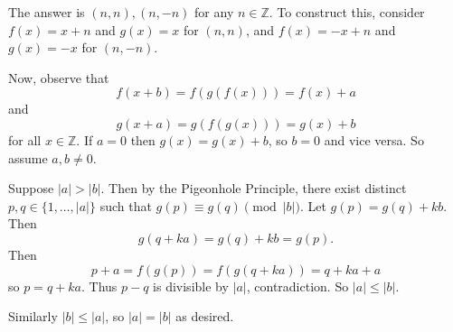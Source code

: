 The answer is $\boxed{(n,n),(n,-n)}$ for any $n\in\mathbb{Z}$. To construct this, consider $f(x)=x+n$ and $g(x)=x$ for $(n,n)$, and $f(x)=-x+n$ and $g(x)=-x$ for $(n,-n)$.

Now, observe that \[f(x+b)=f(g(f(x)))=f(x)+a\] and \[g(x+a)=g(f(g(x)))=g(x)+b\] for all $x\in\mathbb{Z}$. If $a=0$ then $g(x)=g(x)+b$, so $b=0$ and vice versa. So assume $a,b\neq0$.

Suppose $|a|>|b|$. Then by the Pigeonhole Principle, there exist distinct $p,q\in\{1,\ldots,|a|\}$ such that $g(p)\equiv g(q)\pmod{|b|}$. Let $g(p)=g(q)+kb$. Then \[g(q+ka)=g(q)+kb=g(p).\] Then \[p+a=f(g(p))=f(g(q+ka))=q+ka+a\] so $p=q+ka$. Thus $p-q$ is divisible by $|a|$, contradiction. So $|a|\leq |b|$.

Similarly $|b|\leq |a|$, so $|a|=|b|$ as desired.